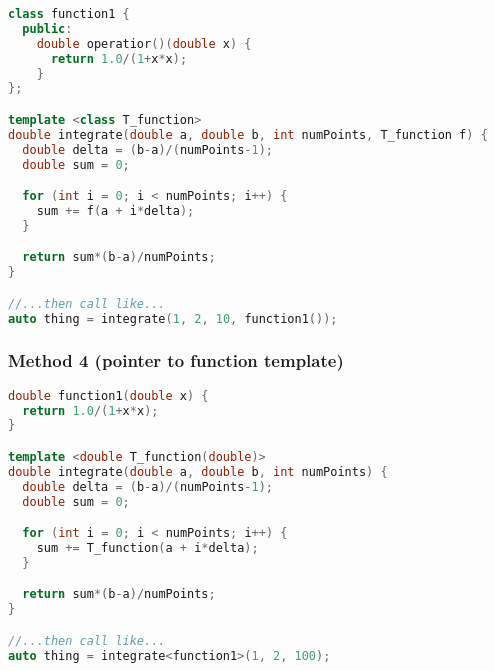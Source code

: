 \begin{lstlisting}[language=C++]
class function1 {
  public:
    double operatior()(double x) {
      return 1.0/(1+x*x);
    }
};

template <class T_function>
double integrate(double a, double b, int numPoints, T_function f) {
  double delta = (b-a)/(numPoints-1);
  double sum = 0;

  for (int i = 0; i < numPoints; i++) {
    sum += f(a + i*delta);
  }

  return sum*(b-a)/numPoints;
}

//...then call like...
auto thing = integrate(1, 2, 10, function1());
\end{lstlisting}


\subsubsection{Method 4 (pointer to function template)}

\begin{lstlisting}[language=C++]
double function1(double x) {
  return 1.0/(1+x*x);
}

template <double T_function(double)>
double integrate(double a, double b, int numPoints) {
  double delta = (b-a)/(numPoints-1);
  double sum = 0;

  for (int i = 0; i < numPoints; i++) {
    sum += T_function(a + i*delta);
  }

  return sum*(b-a)/numPoints;
}

//...then call like...
auto thing = integrate<function1>(1, 2, 100);
\end{lstlisting}
